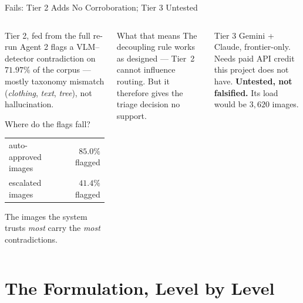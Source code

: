 \documentclass[aspectratio=169,11pt]{beamer}
\begin{document}
\begin{frame}{Fails: Tier 2 Adds No Corroboration; Tier 3 Untested}
\begin{columns}[T]
\begin{block}{\small Tier 2, fed from the full re-run}
\footnotesize Agent 2 flags a VLM--detector contradiction on $\mathbf{71.97\%}$ of the corpus --- mostly taxonomy mismatch (\emph{clothing}, \emph{text}, \emph{tree}), not hallucination.
\vspace{1mm}

Where do the flags fall?
\vspace{1mm}
\begin{center}
\begin{tabular}{@{}l r@{}}
auto-approved images & $\mathbf{85.0\%}$ flagged \\
escalated images & $41.4\%$ flagged \\
\end{tabular}
\end{center}
\vspace{1mm}
The images the system trusts \emph{most} carry the \emph{most} contradictions.
\end{block}

\begin{alertblock}{\small What that means}
\footnotesize The decoupling rule works as designed --- Tier~2 cannot influence routing. But it therefore gives the triage decision no support.
\end{alertblock}
\vspace{1mm}
\begin{block}{\small Tier 3}
\footnotesize Gemini + Claude, frontier-only. Needs paid API credit this project does not have. \textbf{Untested, not falsified.} Its load would be $3{,}620$ images.
\end{block}
\end{columns}
\end{frame}

\section{The Formulation, Level by Level}
\end{document}
